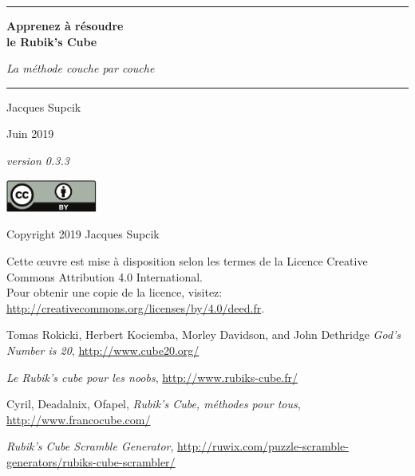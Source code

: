 \documentclass[10pt,paper=a5,pagesize]{scrbook}
\begin{document}
\frontmatter
\thispagestyle{empty}
\begin{titlepage}
\begin{center}

\rule{\textwidth}{1pt}
{\Huge\textbf{Apprenez à résoudre\\
\medskip
le Rubik's Cube}}
\bigskip

{\LARGE\textit{La méthode \og couche par couche\fg}}
\rule{\textwidth}{1pt}
\vspace*{10mm}

{\Large Jacques Supcik}
\vspace*{10mm}

\enlargethispage{15mm}
{\Large Juin 2019}
\vfill

{\large\textit{\textcolor[gray]{0.1}{version 0.3.3}}}

\end{center}
\end{titlepage}

\thispagestyle{empty}
\par\vspace*{\fill}
\includegraphics[width=30mm]{by.pdf}

Copyright \textcopyright{} 2019 Jacques Supcik

Cette œuvre est mise à disposition selon les termes de la Licence Creative Commons Attribution 4.0 International.
\medskip\\
Pour obtenir une copie de la licence, visitez:\\
\url{http://creativecommons.org/licenses/by/4.0/deed.fr}.
\newpage

\tableofcontents

\mainmatter







\backmatter
\begin{thebibliography}{9}
	
	 Tomas Rokicki, Herbert Kociemba, Morley Davidson, and John Dethridge
	\emph{God's Number is 20},
	\url{http://www.cube20.org/}

	\emph{Le Rubik's cube pour les noobs},
	\url{http://www.rubiks-cube.fr/}

	Cyril, Deadalnix, Ofapel,
	\emph{Rubik's Cube, méthodes pour tous},
	\url{http://www.francocube.com/}
	
	\emph{Rubik’s Cube Scramble Generator},
	\url{http://ruwix.com/puzzle-scramble-generators/rubiks-cube-scrambler/}
	
	
\end{thebibliography}
\end{document}
